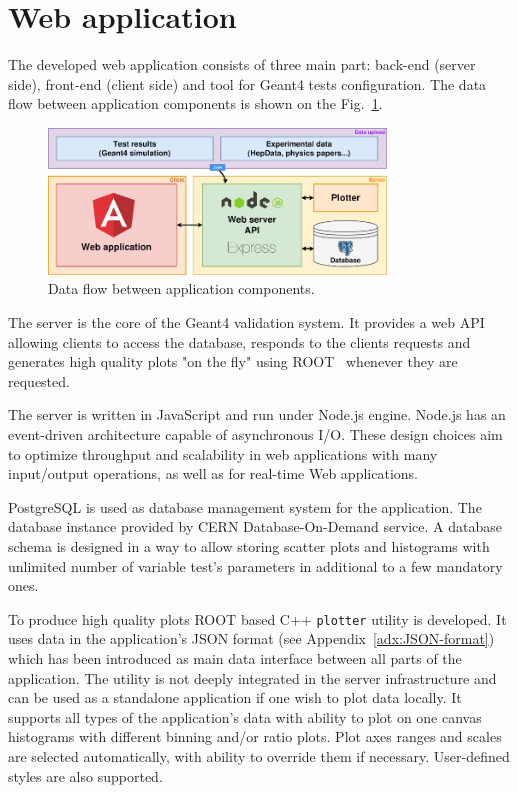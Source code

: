 \section{Web application}
\label{sec-webapplication}

The developed web application consists of three main part: back-end (server side), front-end (client side) and tool 
for Geant4 tests configuration. The data flow between application components is shown on the Fig.~\ref{fig:dataflow}.

\begin{figure}[h]
    \centering
    \includegraphics[width=0.8\textwidth,clip]{schema.png}
    \caption{Data flow between application components.}
    \label{fig:dataflow}
\end{figure}

The server is the core of the Geant4 validation system. It provides a web API allowing clients to access the database, responds to the clients requests and generates high quality plots "on the fly" using ROOT~\cite{ROOT} whenever they are requested.

The server is written in JavaScript and run under Node.js engine. Node.js has an event-driven architecture capable of asynchronous I/O. These design choices aim to optimize throughput and scalability in web applications with many input/output operations, as well as for real-time Web applications.

PostgreSQL is used as database management system for the application. The database instance provided by CERN Database-On-Demand service. A database schema is designed in a way to allow storing scatter plots and histograms with unlimited number of variable test's parameters in additional to a few mandatory ones.

To produce high quality plots ROOT based C++ {\tt plotter} utility is developed. It uses data in the application's JSON format (see Appendix~\ref{adx:JSON-format}) which has been introduced as main data interface between all parts of the application. The utility is not deeply integrated in the server infrastructure and can be used as a standalone application if one wish to plot data locally. It supports all types of the application's data with ability to plot on one canvas histograms with different binning and/or ratio plots. Plot axes ranges and scales are selected automatically, with ability to override them if necessary. User-defined styles are also supported.

